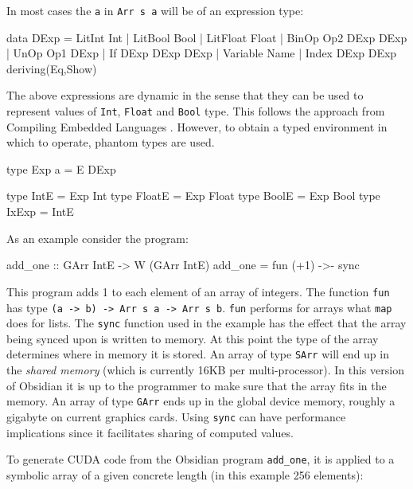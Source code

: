 In most cases the {\tt a} in {\tt Arr s a} will be of an expression type: 
\begin{code} 
data DExp = LitInt Int
          | LitBool Bool
          | LitFloat Float 
          | BinOp Op2 DExp DExp 
          | UnOp  Op1 DExp 
          | If DExp DExp DExp 
          | Variable Name 
          | Index DExp DExp  
            deriving(Eq,Show)
\end{code} 

The above expressions are dynamic in the sense that they can be used to 
represent values of {\tt Int}, {\tt Float} and {\tt Bool} type. 
This follows the approach from Compiling Embedded Languages 
\cite{COMPILEEDSL}. However, 
to obtain a typed environment in which to operate, phantom types are used. 

\begin{code} 
type Exp a = E DExp

type IntE   = Exp Int
type FloatE = Exp Float
type BoolE  = Exp Bool
type IxExp  = IntE 
\end{code}

As an example consider the program: 
\begin{code} 
add_one :: GArr IntE -> W (GArr IntE)
add_one = fun (+1) ->- sync
\end{code} 
This program adds 1 to each element of an array of integers. The function {\tt fun}
has type {\tt (a -> b) -> Arr s a -> Arr s b}. {\tt fun} performs for arrays what 
{\tt map} does for lists. 
The {\tt sync} function used in the example has the effect that
the array being synced upon is written to memory. At this point the type of 
the array determines where in memory it is stored. An array of type {\tt SArr} 
will end up in the {\em shared memory} (which is currently 16KB per multi-processor). 
In this version of Obsidian it is up to the programmer to make sure that the 
array fits in the memory. An array of type  {\tt GArr} ends up in the global 
device memory, roughly a gigabyte on current graphics cards.  Using {\tt sync} 
can have performance implications since it facilitates sharing of computed 
values. 

To generate CUDA code from the Obsidian program {\tt add\_one}, it is applied to
a symbolic array of a given concrete length (in this example 256 elements): 

